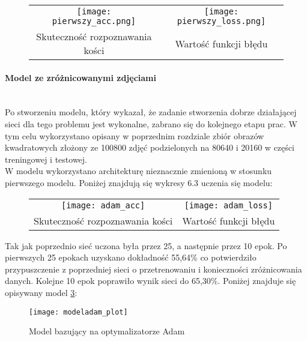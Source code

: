 \begin{figure}[h!]
\begin{center}
\begin{tabular}{cc}
\texttt{[image: pierwszy\_acc.png]} &
\texttt{[image: pierwszy\_loss.png]} \\
 Skuteczność rozpoznawania kości & Wartość funkcji błędu\\
\end{tabular}
\label{fig:first_plots}
\end{center}
\end{figure}

\paragraph{Model ze zróżnicowanymi zdjęciami} \mbox{}\\
Po stworzeniu modelu, który wykazał, że zadanie stworzenia dobrze działającej sieci dla
tego problemu jest wykonalne, zabrano się do kolejnego etapu prac. W tym celu
wykorzystano opisany w poprzednim rozdziale zbiór obrazów kwadratowych złożony ze 100800 zdjęć
podzielonych na 80640 i 20160 w części treningowej i testowej.\\
W modelu wykorzystano architekturę nieznacznie zmienioną w stosunku pierwszego modelu.
Poniżej znajdują się wykresy 6.3 uczenia się modelu:

\begin{figure}[h!]
\begin{center}
\begin{tabular}{cc}
\texttt{[image: adam\_acc]} &
\texttt{[image: adam\_loss]} \\
 Skuteczność rozpoznawania kości & Wartość funkcji błędu\\
\end{tabular}
\label{fig:adam_plots}
\end{center}
\end{figure}

Tak jak poprzednio sieć uczona była przez 25, a następnie przez 10 epok.
Po pierwszych 25 epokach uzyskano dokładność 55,64\% co potwierdziło przypuszczenie
z poprzedniej sieci o przetrenowaniu i konieczności zróżnicowania danych.
Kolejne 10 epok poprawiło wynik sieci do 65,30\%. Poniżej znajduje się opisywany model \ref{fig:adam}: \newpage

\begin{figure}[h!]
\centering
\texttt{[image: modeladam\_plot]}
\caption{Model bazujący na optymalizatorze Adam}
\label{fig:adam}
\end{figure}

